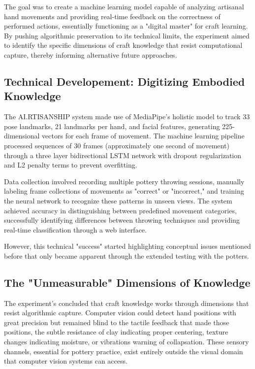 \vspace{0.5cm}

The goal was to create a machine learning model capable of analyzing artisanal hand movements and providing real-time feedback on the correctness of performed actions, essentially functioning as a "digital master" for craft learning. By pushing algorithmic preservation to its technical limits, the experiment aimed to identify the specific dimensions of craft knowledge that resist computational capture, thereby informing alternative future approaches.

\subsection{Technical Developement: Digitizing Embodied Knowledge}

The AI.RTISANSHIP system made use of MediaPipe's holistic model to track 33 pose landmarks, 21 landmarks per hand, and facial features, generating 225-dimensional vectors for each frame of movement. The machine learning pipeline processed sequences of 30 frames (approximately one second of movement) through a three layer bidirectional LSTM network with dropout regularization and L2 penalty terms to prevent overfitting.

\vspace{0.5cm}

Data collection involved recording multiple pottery throwing sessions, manually labeling frame collections of movements as "correct" or "incorrect," and training the neural network to recognize these patterns in unseen views. The system achieved accuracy in distinguishing between predefined movement categories, successfully identifying differences between throwing techniques and providing real-time classification through a web interface.

\vspace{0.5cm}

However, this technical "success" started highlighting conceptual issues mentioned before that only became apparent through the extended testing with the potters.

\subsection{The "Unmeasurable" Dimensions of Knowledge}

The experiment's concluded that craft knowledge works through dimensions that resist algorithmic capture. Computer vision could detect hand positions with great precision but remained blind to the tactile feedback that made those positions, the subtle resistance of clay indicating proper centering, texture changes indicating moisture, or vibrations warning of collapsation. These sensory channels, essential for pottery practice, exist entirely outside the visual domain that computer vision systems can access.

